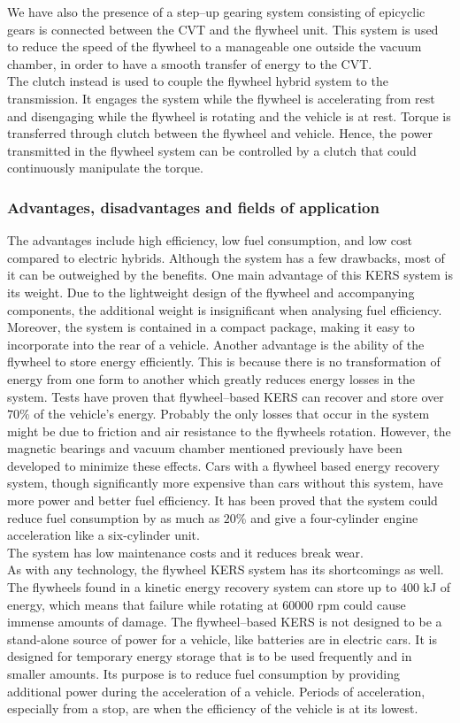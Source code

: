 \documentclass[11pt]{article}
\begin{document}
We have also the presence of a step--up gearing system consisting of epicyclic gears is connected between the CVT and the flywheel unit. This system is used to reduce the speed of the flywheel to a manageable one outside the vacuum chamber, in order to have a smooth transfer of energy to the CVT.\\
The clutch instead is used to couple the flywheel hybrid system to the transmission. It engages the system while the flywheel is accelerating from rest and disengaging while the flywheel is rotating and the vehicle is at rest. Torque is transferred through clutch between the flywheel and vehicle. Hence, the power transmitted in the flywheel system can be controlled by a clutch that could continuously manipulate the torque.

\subsubsection{Advantages, disadvantages and fields of application}

The advantages include high efficiency, low fuel consumption, and low cost compared to electric hybrids. Although the system has a few drawbacks, most of it can be outweighed by the benefits. One main advantage of this KERS system is its weight. Due to the lightweight design of the flywheel and accompanying components, the additional weight is insignificant when analysing fuel efficiency. Moreover, the system is contained in a compact package, making it easy to incorporate into the rear of a vehicle. Another advantage is the ability of the flywheel to store energy efficiently. This is because there is no transformation of energy from one form to another which greatly reduces energy losses in the system. Tests have proven that flywheel--based KERS can recover and store over $70\%$ of the vehicle’s energy. Probably the only losses that occur in the system might be due to friction and air resistance to the flywheels rotation. However, the magnetic bearings and vacuum chamber mentioned previously have been developed to minimize these effects. Cars with a flywheel based energy recovery system, though significantly more expensive than cars without this system, have more power and better fuel efficiency. It has been proved that the system could reduce fuel consumption by as much as $20$\% and give a four-cylinder engine acceleration like a six-cylinder unit.\\
The system has low maintenance costs and it reduces break wear.\\
As with any technology, the flywheel KERS system has its shortcomings as well. The flywheels found in a kinetic energy recovery system can store up to $400$ kJ of energy, which means that failure while rotating at $60000$ rpm could cause immense amounts of damage. The flywheel--based KERS is not designed to be a stand-alone source of power for a vehicle, like batteries are in electric cars. It is designed for temporary energy storage that is to be used frequently and in smaller amounts. Its purpose is to reduce fuel consumption by providing additional power during the acceleration of a vehicle. Periods of acceleration, especially from a stop, are when the efficiency of the vehicle is at its lowest.
\end{document}
